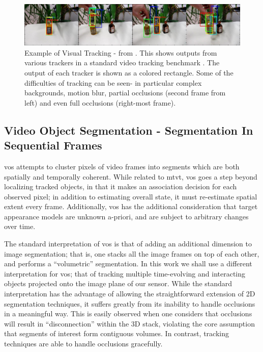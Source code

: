 \begin{figure}
\label{fig:ExampleTracking}
\centering
\includegraphics[width=\linewidth]{figures/Introduction/Tracking_Example.pdf}
\caption[Example of Visual Tracking]{Example of Visual Tracking - from \cite{PartFilter_Papon_2012}. This shows outputs from various trackers in a standard video tracking benchmark \cite{PROST}. The output of each tracker is shown as a colored rectangle. Some of the difficulties of tracking can be seen- in particular complex backgrounds, motion blur, partial occlusions (second frame from left) and even full occlusions (right-most frame).}
\end{figure}

\subsection{Video Object Segmentation - Segmentation In Sequential Frames}
\gls{vos} attempts to cluster pixels of video frames into segments which are both spatially and temporally coherent. While related to \gls{mtvt}, \gls{vos} goes a step beyond localizing tracked objects, in that it makes an association decision for each observed pixel; in addition to estimating overall state, it must re-estimate spatial extent every frame. Additionally, \gls{vos} has the additional consideration that target appearance models are unknown a-priori, and are subject to arbitrary changes over time. 

The standard interpretation of \gls{vos} is that of adding an additional dimension to image segmentation; that is, one stacks all the image frames on top of each other, and performs a ``volumetric'' segmentation. In this work we shall use a different interpretation for \gls{vos}; that of tracking multiple time-evolving and interacting objects projected onto the image plane of our sensor. While the standard interpretation has the advantage of allowing the straightforward extension of 2D segmentation techniques, it suffers greatly from its inability to handle occlusions in a meaningful way. This is easily observed when one considers that occlusions will result in ``disconnection'' within the 3D stack, violating the core assumption that segments of interest form contiguous volumes. In contrast, tracking techniques are able to handle occlusions gracefully.  

